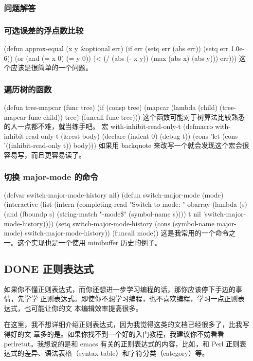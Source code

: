 \documentclass[11pt]{ctexart}
\begin{document}
{{{{\subsubsection{问题解答}
\label{sec:org1aad77b}
\subsubsection{可选误差的浮点数比较}
\label{sec:orge56996f}
(defun approx-equal (x y \&optional err)
(if err
(setq err (abs err))
(setq err 1.0e-6))
(or (and (= x 0) (= y 0))
(< (/ (abs (- x y))
(max (abs x) (abs y)))
err)))
这个应该是很简单的一个问题。
\subsubsection{遍历树的函数}
\label{sec:orgb752973}
(defun tree-mapcar (func tree)
(if (consp tree)
(mapcar (lambda (child)
(tree-mapcar func child))
tree)
(funcall func tree)))
这个函数可能对于树算法比较熟悉的人一点都不难，就当练手吧。
宏 with-inhibit-read-only-t
(defmacro with-inhibit-read-only-t (\&rest body)
(declare (indent 0) (debug t))
(cons 'let (cons '((inhibit-read-only t))
body)))
如果用 backquote 来改写一个就会发现这个宏会很容易写，而且更容易读了。
\subsubsection{切换 major-mode 的命令}
\label{sec:org2e8c4d3}
(defvar switch-major-mode-history nil)
(defun switch-major-mode (mode)
(interactive
(list
(intern
(completing-read "Switch to mode: "
obarray (lambda (s)
(and (fboundp s)
(string-match "-mode\$" (symbol-name s))))
t nil 'switch-major-mode-history))))
(setq switch-major-mode-history
(cons (symbol-name major-mode) switch-major-mode-history))
(funcall mode))
这是我常用的一个命令之一。这个实现也是一个使用 minibuffer 历史的例子。
\subsection{{\bfseries\sffamily DONE} 正则表达式}
\label{sec:orgd74e4cc}
如果你不懂正则表达式，而你还想进一步学习编程的话，那你应该停下手边的事情，先学学
正则表达式。即使你不想学习编程，也不喜欢编程，学习一点正则表达式，也可能让你的文
本编辑效率提高很多。

在这里，我不想详细介绍正则表达式，因为我觉得这类的文档已经很多了，比我写得好的文
章多的是。如果你找不到一个好的入门教程，我建议你不妨看看 perlretut。我想说的是和
emacs 有关的正则表达式的内容，比如，和 Perl 正则表达式的差异、语法表格（syntax
table）和字符分类（category）等。
}}}}
\end{document}
